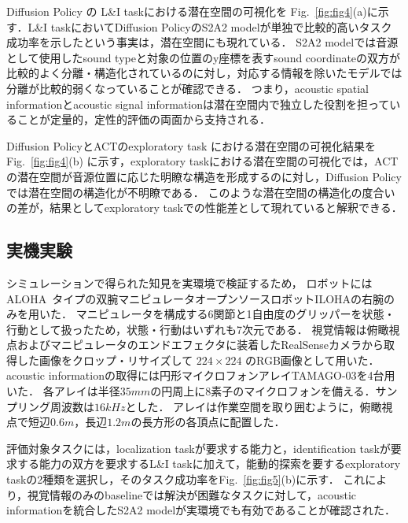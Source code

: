 \documentclass{article}
\begin{document}
	Diffusion Policy の L\&I taskにおける潜在空間の可視化を
	Fig.~\ref{fig:fig4}(a)に示す．L\&I taskにおいてDiffusion PolicyのS2A2 modelが単独で比較的高いタスク成功率を示したという事実は，潜在空間にも現れている．
	S2A2 modelでは音源として使用したsound typeと対象の位置のy座標を表すsound coordinateの双方が比較的よく分離・構造化されているのに対し，対応する情報を除いたモデルでは分離が比較的弱くなっていることが確認できる．
	つまり，acoustic spatial informationとacoustic signal informationは潜在空間内で独立した役割を担っていることが定量的，定性的評価の両面から支持される．

	Diffusion PolicyとACTのexploratory task における潜在空間の可視化結果を Fig.~\ref{fig:fig4}(b) に示す，exploratory taskにおける潜在空間の可視化では，ACTの潜在空間が音源位置に応じた明瞭な構造を形成するのに対し，Diffusion Policyでは潜在空間の構造化が不明瞭である．
	このような潜在空間の構造化の度合いの差が，結果としてexploratory taskでの性能差として現れていると解釈できる．

\subsection{実機実験}
\label{sec:real}
シミュレーションで得られた知見を実環境で検証するため，
ロボットにはALOHA~\citep{act}タイプの双腕マニピュレータオープンソースロボットILOHAの右腕のみを用いた．
マニピュレータを構成する6関節と1自由度のグリッパーを状態・行動として扱ったため，状態・行動はいずれも7次元である．
視覚情報は俯瞰視点およびマニピュレータのエンドエフェクタに装着したRealSenseカメラから取得した画像をクロップ・リサイズして $224\times224$ のRGB画像として用いた．
acoustic informationの取得には円形マイクロフォンアレイTAMAGO-03を4台用いた．
各アレイは半径$35mm$の円周上に$8$素子のマイクロフォンを備える．サンプリング周波数は$16kHz$とした．
アレイは作業空間を取り囲むように，俯瞰視点で短辺$0.6m$，長辺$1.2m$の長方形の各頂点に配置した．

評価対象タスクには，localization taskが要求する能力と，identification taskが要求する能力の双方を要求するL\&I taskに加えて，能動的探索を要するexploratory taskの2種類を選択し，そのタスク成功率をFig.~\ref{fig:fig5}(b)に示す．
これにより，視覚情報のみのbaselineでは解決が困難なタスクに対して，acoustic informationを統合したS2A2 modelが実環境でも有効であることが確認された．
	


\end{document}
